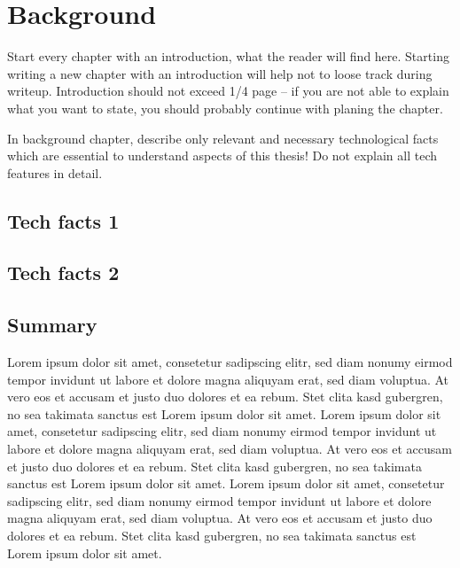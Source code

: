 \chapter{Background}
\label{ch:background}

Start every chapter with an introduction, what the reader will find 
here. Starting writing a new chapter with an introduction will help 
not to loose track during writeup. Introduction should not exceed 1/4 page --
if you are not able to explain what you want to state, you should probably
continue with planing the chapter.

In background chapter, describe only relevant and necessary technological 
facts which are essential to understand aspects of this thesis! Do not 
explain all tech features in detail.

\section{Tech facts 1}
\label{sec:back:techfacts1}



\section{Tech facts 2}
\label{sec:back:techfacts2}


\section{Summary}
\label{ch:background:summary}


Lorem ipsum dolor sit amet, consetetur sadipscing elitr, sed diam nonumy eirmod tempor invidunt ut labore et dolore magna aliquyam erat, sed diam voluptua. At vero eos et accusam et justo duo dolores et ea rebum. Stet clita kasd gubergren, no sea takimata sanctus est Lorem ipsum dolor sit amet. Lorem ipsum dolor sit amet, consetetur sadipscing elitr, sed diam nonumy eirmod tempor invidunt ut labore et dolore magna aliquyam erat, sed diam voluptua. At vero eos et accusam et justo duo dolores et ea rebum. Stet clita kasd gubergren, no sea takimata sanctus est Lorem ipsum dolor sit amet. Lorem ipsum dolor sit amet, consetetur sadipscing elitr, sed diam nonumy eirmod tempor invidunt ut labore et dolore magna aliquyam erat, sed diam voluptua. At vero eos et accusam et justo duo dolores et ea rebum. Stet clita kasd gubergren, no sea takimata sanctus est Lorem ipsum dolor sit amet.   

